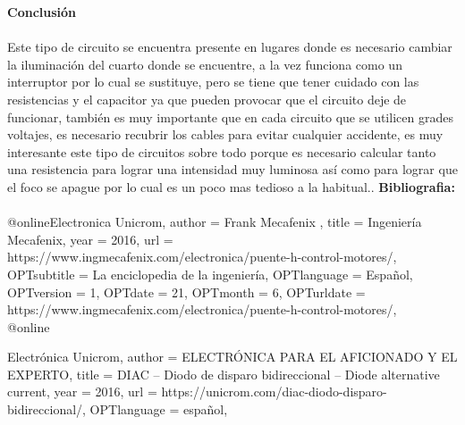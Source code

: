\documentclass[12pt]{report}
\begin{document}
{\huge \textbf{Conclusión}\\}\\
{\large Este tipo de circuito se encuentra presente en lugares donde es necesario cambiar la iluminación del cuarto donde se encuentre, a la vez funciona como un interruptor por lo cual se sustituye, pero se tiene que tener cuidado con las resistencias y el capacitor ya que pueden provocar que el circuito deje de funcionar, también es muy importante que en cada circuito que se utilicen grades voltajes, es necesario recubrir los cables para evitar cualquier accidente, es muy interesante este tipo de circuitos sobre todo porque es necesario calcular tanto una resistencia para lograr una intensidad muy luminosa así como para lograr que el foco se apague por lo cual es un poco mas tedioso a la habitual..}
\newpage
{\huge \textbf{Bibliografia:}\\}\\
@online{Electronica Unicrom,
author = {Frank Mecafenix },
title = {Ingeniería Mecafenix},
year = {2016},
url = {https://www.ingmecafenix.com/electronica/puente-h-control-motores/},
OPTsubtitle = {La enciclopedia de la ingeniería},
OPTlanguage = {Español},
OPTversion = {1},
OPTdate = {21},
OPTmonth = {6},
OPTurldate = {https://www.ingmecafenix.com/electronica/puente-h-control-motores/},
}
\\
@online{Electrónica Unicrom,
author = {ELECTRÓNICA PARA EL AFICIONADO Y EL EXPERTO},
title = {DIAC – Diodo de disparo bidireccional – Diode alternative current},
year = {2016},
url = {https://unicrom.com/diac-diodo-disparo-bidireccional/},
OPTlanguage = {español},

}
\end{document}
